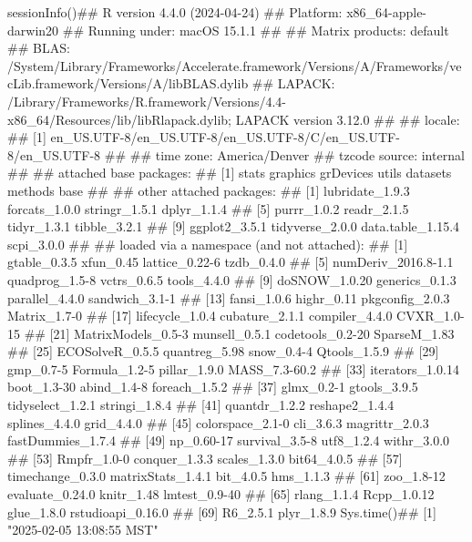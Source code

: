 \documentclass{article}\usepackage[]{graphicx}\usepackage[]{xcolor}
\begin{document}
sessionInfo()## R version 4.4.0 (2024-04-24)
## Platform: x86_64-apple-darwin20
## Running under: macOS 15.1.1
## 
## Matrix products: default
## BLAS:   /System/Library/Frameworks/Accelerate.framework/Versions/A/Frameworks/vecLib.framework/Versions/A/libBLAS.dylib 
## LAPACK: /Library/Frameworks/R.framework/Versions/4.4-x86_64/Resources/lib/libRlapack.dylib;  LAPACK version 3.12.0
## 
## locale:
## [1] en_US.UTF-8/en_US.UTF-8/en_US.UTF-8/C/en_US.UTF-8/en_US.UTF-8
## 
## time zone: America/Denver
## tzcode source: internal
## 
## attached base packages:
## [1] stats     graphics  grDevices utils     datasets  methods   base     
## 
## other attached packages:
##  [1] lubridate_1.9.3   forcats_1.0.0     stringr_1.5.1     dplyr_1.1.4      
##  [5] purrr_1.0.2       readr_2.1.5       tidyr_1.3.1       tibble_3.2.1     
##  [9] ggplot2_3.5.1     tidyverse_2.0.0   data.table_1.15.4 scpi_3.0.0       
## 
## loaded via a namespace (and not attached):
##  [1] gtable_0.3.5        xfun_0.45           lattice_0.22-6      tzdb_0.4.0         
##  [5] numDeriv_2016.8-1.1 quadprog_1.5-8      vctrs_0.6.5         tools_4.4.0        
##  [9] doSNOW_1.0.20       generics_0.1.3      parallel_4.4.0      sandwich_3.1-1     
## [13] fansi_1.0.6         highr_0.11          pkgconfig_2.0.3     Matrix_1.7-0       
## [17] lifecycle_1.0.4     cubature_2.1.1      compiler_4.4.0      CVXR_1.0-15        
## [21] MatrixModels_0.5-3  munsell_0.5.1       codetools_0.2-20    SparseM_1.83       
## [25] ECOSolveR_0.5.5     quantreg_5.98       snow_0.4-4          Qtools_1.5.9       
## [29] gmp_0.7-5           Formula_1.2-5       pillar_1.9.0        MASS_7.3-60.2      
## [33] iterators_1.0.14    boot_1.3-30         abind_1.4-8         foreach_1.5.2      
## [37] glmx_0.2-1          gtools_3.9.5        tidyselect_1.2.1    stringi_1.8.4      
## [41] quantdr_1.2.2       reshape2_1.4.4      splines_4.4.0       grid_4.4.0         
## [45] colorspace_2.1-0    cli_3.6.3           magrittr_2.0.3      fastDummies_1.7.4  
## [49] np_0.60-17          survival_3.5-8      utf8_1.2.4          withr_3.0.0        
## [53] Rmpfr_1.0-0         conquer_1.3.3       scales_1.3.0        bit64_4.0.5        
## [57] timechange_0.3.0    matrixStats_1.4.1   bit_4.0.5           hms_1.1.3          
## [61] zoo_1.8-12          evaluate_0.24.0     knitr_1.48          lmtest_0.9-40      
## [65] rlang_1.1.4         Rcpp_1.0.12         glue_1.8.0          rstudioapi_0.16.0  
## [69] R6_2.5.1            plyr_1.8.9
Sys.time()## [1] "2025-02-05 13:08:55 MST"
\end{document}
